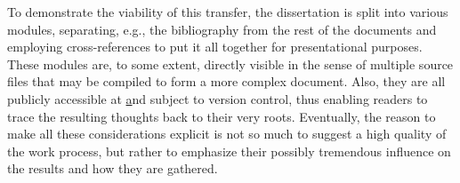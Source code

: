 \documentclass[jou]{apa6} %
\begin{document}
To demonstrate the viability of this transfer, the dissertation is split into various modules, separating, e.g., the bibliography from the rest of the documents and employing cross-references to put it all together for presentational purposes. These modules are, to some extent, directly visible in the sense of multiple source files that may be compiled to form a more complex document. Also, they are all publicly accessible at \href{https://github.com/konstantinschulz/asrael} and subject to version control, thus enabling readers to trace the resulting thoughts back to their very roots. Eventually, the reason to make all these considerations explicit is not so much to suggest a high quality of the work process, but rather to emphasize their possibly tremendous influence on the results and how they are gathered.


\printbibliography[heading=bibintoc]
\end{document}
